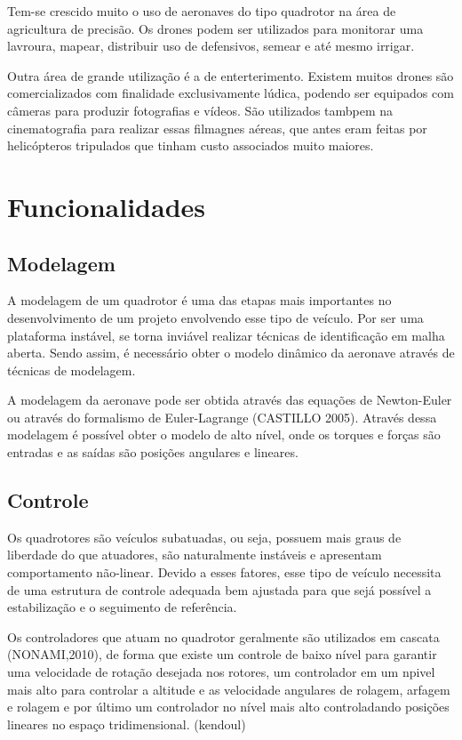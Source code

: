 Tem-se crescido muito o uso de aeronaves do tipo quadrotor na área de agricultura de precisão. Os drones podem ser utilizados para monitorar uma lavroura, mapear, distribuir uso de defensivos, semear e até mesmo irrigar.

Outra área de grande utilização é a de enterterimento. Existem muitos drones são comercializados com finalidade exclusivamente lúdica, podendo ser equipados com câmeras para produzir fotografias e vídeos. São utilizados tambpem na cinematografia para realizar essas filmagnes aéreas, que antes eram feitas por helicópteros tripulados que tinham custo associados muito maiores.


\section{Funcionalidades}

\subsection{Modelagem}
A modelagem de um quadrotor é uma das etapas mais importantes no desenvolvimento de um projeto envolvendo esse tipo de veículo. Por ser uma plataforma instável, se torna inviável realizar técnicas de identificação em malha aberta. Sendo assim, é necessário obter o modelo dinâmico da aeronave através de técnicas de modelagem.

A modelagem da aeronave pode ser obtida através das equações de Newton-Euler ou através do formalismo de Euler-Lagrange (CASTILLO 2005). Através dessa modelagem é possível obter o modelo de alto nível, onde os torques e forças são entradas e as saídas são posições angulares e lineares. 

\subsection{Controle}
Os quadrotores são veículos subatuadas, ou seja, possuem mais graus de liberdade do que atuadores, são naturalmente instáveis e apresentam comportamento não-linear. Devido a esses fatores, esse tipo de veículo necessita de uma estrutura de controle adequada bem ajustada para que sejá possível a estabilização e o seguimento de referência.

Os controladores que atuam no quadrotor geralmente são utilizados em cascata (NONAMI,2010), de forma que existe um controle de baixo nível para garantir uma velocidade de rotação desejada nos rotores, um controlador em um npivel mais alto para controlar a altitude e as velocidade angulares de rolagem, arfagem e rolagem e por último um controlador no nível mais alto controladando posições lineares no espaço tridimensional. (kendoul)

